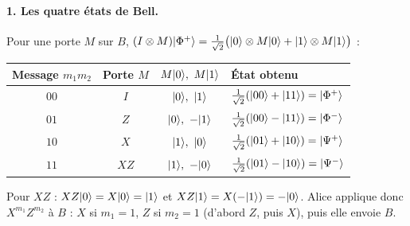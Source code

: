 \begin{correction}
\paragraph{1. Les quatre états de Bell.} Pour une porte $M$ sur $B$,
$(I\otimes M)|\Phi^+\rangle=\frac{1}{\sqrt2}\big(|0\rangle\otimes M|0\rangle+|1\rangle\otimes M|1\rangle\big)$ :
\begin{center}
\renewcommand{\arraystretch}{1.3}
\begin{tabular}{@{}c c c l@{}}
\toprule
Message $m_1m_2$ & Porte $M$ & $M\ket{0},\ M\ket{1}$ & État obtenu \\
\midrule
$00$ & $I$ & $\ket{0},\ \ket{1}$ & $\frac{1}{\sqrt2}(|00\rangle+|11\rangle)=|\Phi^+\rangle$ \\
$01$ & $Z$ & $\ket{0},\ -\ket{1}$ & $\frac{1}{\sqrt2}(|00\rangle-|11\rangle)=|\Phi^-\rangle$ \\
$10$ & $X$ & $\ket{1},\ \ket{0}$ & $\frac{1}{\sqrt2}(|01\rangle+|10\rangle)=|\Psi^+\rangle$ \\
$11$ & $XZ$ & $\ket{1},\ -\ket{0}$ & $\frac{1}{\sqrt2}(|01\rangle-|10\rangle)=|\Psi^-\rangle$ \\
\bottomrule
\end{tabular}
\end{center}
Pour $XZ$ : $XZ|0\rangle=X|0\rangle=|1\rangle$ et $XZ|1\rangle=X(-|1\rangle)=-|0\rangle$. Alice applique donc
$X^{m_1}Z^{m_2}$ à $B$ : $X$ si $m_1=1$, $Z$ si $m_2=1$ (d'abord $Z$, puis $X$), puis elle envoie $B$.


\end{correction}
